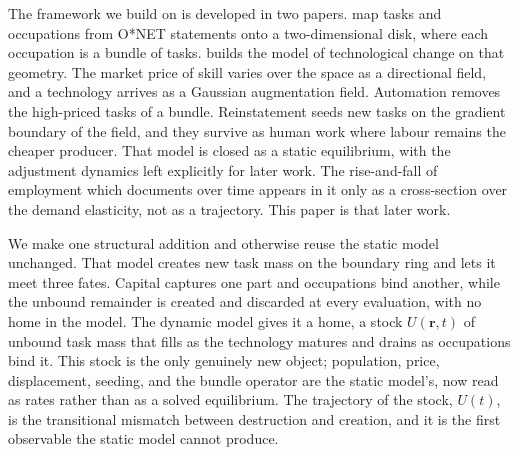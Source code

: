 \documentclass[12pt, a4paper]{article}
\newcommand{\rr}{\mathbf{r}}
\begin{document}
The framework we build on is developed in two papers.
\textcite{storck2026geometry} map tasks and occupations from O*NET
statements onto a two-dimensional disk, where each occupation is a
bundle of tasks. \textcite{storck2026fields} builds the model of
technological change on that geometry. The market price of skill varies
over the space as a directional field, and a technology arrives as a
Gaussian augmentation field. Automation removes the high-priced tasks
of a bundle. Reinstatement seeds new tasks on the gradient boundary of
the field, and they survive as human work where labour remains the
cheaper producer. That model is closed as a static equilibrium, with
the adjustment dynamics left explicitly for later work. The
rise-and-fall of employment which \textcite{bessen2019demand}
documents over time appears in it only as a cross-section over the
demand elasticity, not as a trajectory. This paper is that later
work.

We make one structural addition and otherwise reuse the static model
unchanged. That model creates new task mass on the boundary ring and
lets it meet three fates. Capital captures one part and occupations
bind another, while the unbound remainder is created and discarded at
every evaluation, with no home in the model. The dynamic model gives it
a home, a stock $U(\rr,t)$ of unbound task mass that fills as the
technology matures and drains as occupations bind it. This stock is the
only genuinely new object; population, price, displacement, seeding, and
the bundle operator are the static model's, now read as rates rather
than as a solved equilibrium. The trajectory of the stock, $U(t)$, is the
transitional mismatch between destruction and creation, and it is the
first observable the static model cannot produce.
\end{document}
